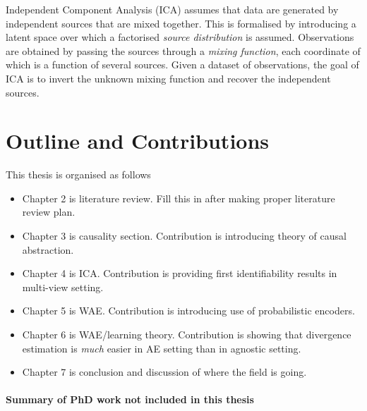 Independent Component Analysis (ICA) assumes that data are generated by independent sources that are mixed together. 
This is formalised by introducing a latent space over which a factorised \emph{source distribution} is assumed. 
Observations are obtained by passing the sources through a \emph{mixing function}, each coordinate of which is a function of several sources.
Given a dataset of observations, the goal of ICA is to invert the unknown mixing function and recover the independent sources.





\section{Outline and Contributions}

This thesis is organised as follows

\begin{itemize}
\item Chapter 2 is literature review. Fill this in after making proper literature review plan.
\item Chapter 3 is causality section. Contribution is introducing theory of causal abstraction.
\item Chapter 4 is ICA. Contribution is providing first identifiability results in multi-view setting.
\item Chapter 5 is WAE. Contribution is introducing use of probabilistic encoders.
\item Chapter 6 is WAE/learning theory. Contribution is showing that divergence estimation is \emph{much} easier in AE setting than in agnostic setting.
\item Chapter 7 is conclusion and discussion of where the field is going.
\end{itemize}

\paragraph{Summary of PhD work not included in this thesis}





















